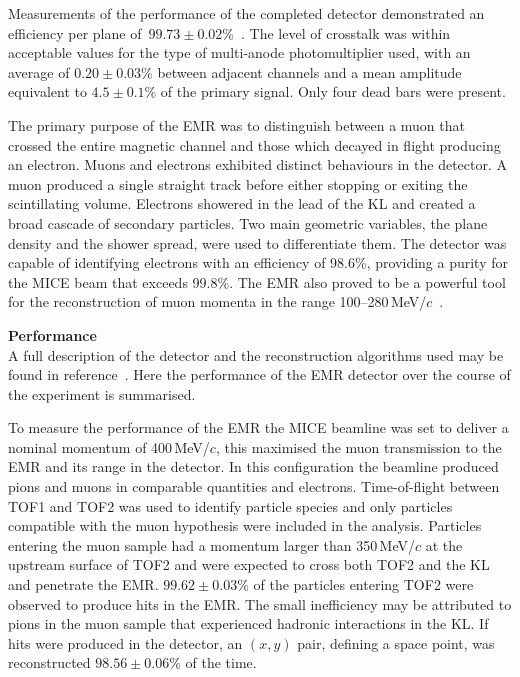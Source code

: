 Measurements of the performance of the completed detector demonstrated
an efficiency per plane
of~$99.73\pm0.02$\%~\cite{2016JInst..11T10007,Drielsma:2017doj}.
The level of crosstalk was within acceptable values for the type of
multi-anode photomultiplier used, with an average of $0.20\pm0.03$\%
between adjacent channels and a mean amplitude
equivalent to $4.5\pm0.1$\% of the primary signal.
Only four dead bars were present.

The primary purpose of the EMR was to distinguish between a muon that crossed  the entire magnetic channel and those which decayed in flight producing an electron.
Muons and electrons exhibited distinct behaviours in the detector.
A muon produced a single straight track before either stopping or
exiting the scintillating volume.
Electrons showered in the lead of the KL and created a broad cascade
of secondary particles.
Two main geometric variables, the plane density and the shower spread,
were used to differentiate them.
The detector was capable of identifying electrons with an efficiency
of 98.6\%, providing a purity for the MICE beam that exceeds
99.8\%.
The EMR also proved to be a powerful tool for the reconstruction of
muon momenta in the range
100--280\,MeV/$c$~\cite{2015JInst..10P2012A}.  \\

\newpage

\noindent\textbf{Performance} \\
\noindent
A full description of the detector and the reconstruction algorithms
used may be found in reference~\cite{2015JInst..10P2012A}.
Here the performance of the EMR detector over the course of the
experiment is summarised.

To measure the performance of the EMR the MICE beamline was set to
deliver a nominal momentum of 400\,MeV/$c$, this maximised the muon
transmission to the EMR and its range in the detector.
In this configuration the beamline produced pions and muons in
comparable quantities and electrons.
Time-of-flight between TOF1 and TOF2 was used to identify particle
species and only particles compatible with the muon hypothesis were
included in the analysis.
Particles entering the muon sample had a momentum larger than
350\,MeV/$c$ at the upstream surface of TOF2 and were expected to
cross both TOF2 and the KL and penetrate the EMR.
$99.62\pm0.03\%$ of the particles entering TOF2 were observed to produce
hits in the EMR.
The small inefficiency may be attributed to pions in the muon sample
that experienced hadronic interactions in the KL.
If hits were produced in the detector, an $(x,y)$ pair, defining a
space point, was reconstructed $98.56\pm0.06\%$ of the time.

